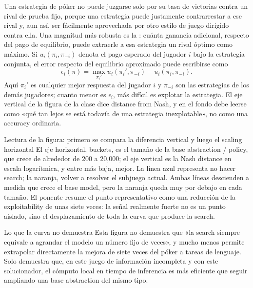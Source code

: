Una estrategia de póker no puede juzgarse solo por su tasa de victorias contra un rival de prueba fijo, porque una estrategia puede justamente contrarrestar a ese rival y, aun así, ser fácilmente aprovechada por otro estilo de juego dirigido contra ella. Una magnitud más robusta es la : cuánta ganancia adicional, respecto del pago de equilibrio, puede extraerle a esa estrategia un rival óptimo como máximo. Si $u_i(\pi_i,\pi_{-i})$ denota el pago esperado del jugador $i$ bajo la estrategia conjunta, el error respecto del equilibrio aproximado puede escribirse como
\begin{equation}
\epsilon_i(\pi)
= \max_{\pi_i'} u_i(\pi_i',\pi_{-i}) - u_i(\pi_i,\pi_{-i}).
\end{equation}
Aquí $\pi_i'$ es cualquier mejor respuesta del jugador $i$ y $\pi_{-i}$ son las estrategias de los demás jugadores; cuanto menor es $\epsilon_i$, más difícil es explotar la estrategia. El eje vertical de la figura de la clase dice distance from Nash, y en el fondo debe leerse como «qué tan lejos se está todavía de una estrategia inexplotable», no como una accuracy ordinaria.


\begin{knowledgebox}{Lectura de la figura: primero se compara la diferencia vertical y luego el scaling horizontal}
El eje horizontal, buckets, es el tamaño de la base abstraction / policy, que crece de alrededor de 200 a 20,000; el eje vertical es la Nash distance en escala logarítmica, y entre más baja, mejor. La línea azul representa no hacer search; la naranja, volver a resolver el subjuego actual. Ambas líneas descienden a medida que crece el base model, pero la naranja queda muy por debajo en cada tamaño. El ponente resume el punto representativo como una reducción de la exploitability de unas siete veces: la señal realmente fuerte no es un punto aislado, sino el desplazamiento de toda la curva que produce la search.
\end{knowledgebox}

\begin{warningbox}{Lo que la curva no demuestra}
Esta figura no demuestra que «la search siempre equivale a agrandar el modelo un número fijo de veces», y mucho menos permite extrapolar directamente la mejora de siete veces del póker a tareas de lenguaje. Solo demuestra que, en este juego de información incompleta y con este solucionador, el cómputo local en tiempo de inferencia es más eficiente que seguir ampliando una base abstraction del mismo tipo.
\end{warningbox}

